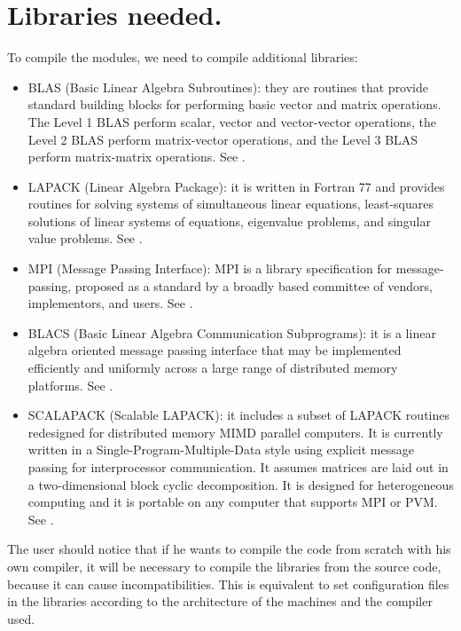 \documentclass[12pt]{article}
\begin{document}
\section{Libraries needed.}
To compile the modules, we need to compile additional libraries:
\begin{itemize}
\item BLAS (Basic Linear Algebra Subroutines): they are routines that provide standard building blocks for performing basic vector and matrix operations. The Level 1 BLAS perform scalar, vector and vector-vector operations, the Level 2 BLAS perform matrix-vector operations, and the Level 3 BLAS perform matrix-matrix operations. See \cite{BLASlibrary}.
\item LAPACK (Linear Algebra Package): it is written in Fortran 77 and provides routines for solving systems of simultaneous linear equations, least-squares solutions of linear systems of equations, eigenvalue problems, and singular value problems. See \cite{LAPACKlibrary}.
\item MPI (Message Passing Interface): MPI is a library specification for message-passing, proposed as a standard by a broadly based committee of vendors, implementors, and users. See \cite{MPIlibrary}.
\item BLACS (Basic Linear Algebra Communication Subprograms): it is a linear algebra oriented message passing interface that may be implemented efficiently and uniformly across a large range of distributed memory platforms. See \cite{BLACSlibrary}. 
\item SCALAPACK (Scalable LAPACK): it includes a subset of LAPACK routines redesigned for distributed memory MIMD parallel computers. It is currently written in a Single-Program-Multiple-Data style using explicit message passing for interprocessor communication. It assumes matrices are laid out in a two-dimensional block cyclic decomposition. It is designed for heterogeneous computing and it is portable on any computer that supports MPI or PVM. See \cite{SCALAPACKlibrary}. 
\end{itemize}

The user should notice that if he wants to compile the code from scratch with his own compiler, it will be necessary to compile the libraries from the source code, because it can cause incompatibilities. This is equivalent to set configuration files in the libraries according to the architecture of the machines and the compiler used. 
\end{document}
